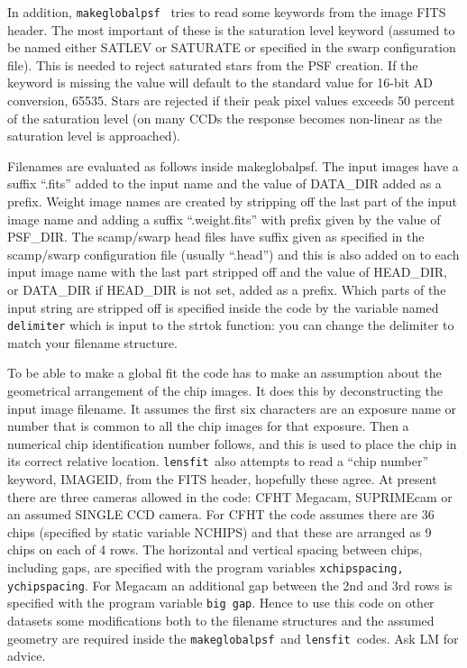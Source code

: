 \documentclass{article}
\def\lensfit{{\tt lensfit}\ }
\def\makeglobalpsf{{\tt makeglobalpsf}\ }
\begin{document}
In addition, \makeglobalpsf 
tries to read some keywords from the image FITS header. The most important 
of these is the saturation level keyword (assumed to be named either SATLEV or SATURATE or specified in the
swarp configuration file). This is 
needed to reject saturated stars from the PSF creation. If the keyword is missing the value will default to 
the standard value for 16-bit AD conversion, 65535. Stars are rejected if their peak pixel values exceeds 
50 percent of the saturation level (on many CCDs the response becomes non-linear as the saturation level is 
approached). 

Filenames are evaluated as follows inside makeglobalpsf. The input images have a suffix ``.fits'' added to 
the input name and the value of DATA\_DIR added as a prefix. Weight image names are created by stripping 
off the last part of the input image name and adding a suffix ``.weight.fits'' with prefix given by the value of 
PSF\_DIR. The scamp/swarp 
head files have suffix given as specified in the scamp/swarp 
configuration 
file (usually ``.head'') and this is also added on to each input image name with the last part stripped off 
and the value of HEAD\_DIR, or DATA\_DIR if HEAD\_DIR is not set, added as a prefix. Which parts of the 
input string are stripped off is specified inside the code by the variable named {\tt delimiter} 
which is input to the strtok 
function: you can change the delimiter to match your filename structure. 

To be able to make a global fit the code has to make an assumption about the geometrical arrangement of the 
chip images. It does this by deconstructing the input image filename. It assumes the first six characters are 
an exposure name or number that is common to all the chip images for that exposure. Then a numerical chip 
identification number follows, and this is used to place the chip in its correct relative location. 
\lensfit also attempts to read a ``chip number'' keyword, IMAGEID, from the FITS header, hopefully these agree.
At present 
there are three cameras allowed in the code:  CFHT Megacam, SUPRIMEcam or an assumed SINGLE CCD camera.
For CFHT the code assumes there are 36 chips (specified by static variable NCHIPS) and that these are arranged as 
9 chips on each of 4 rows. The horizontal and vertical spacing between chips, 
including gaps, are specified with the program variables {\tt xchipspacing, ychipspacing}. For Megacam an 
additional gap between the 2nd and 3rd rows is specified with the program variable {\tt big gap}. Hence to use 
this code on other datasets some modifications both to the filename structures and the assumed geometry 
are required inside the \makeglobalpsf and \lensfit codes. Ask LM for advice. 
\end{document}
